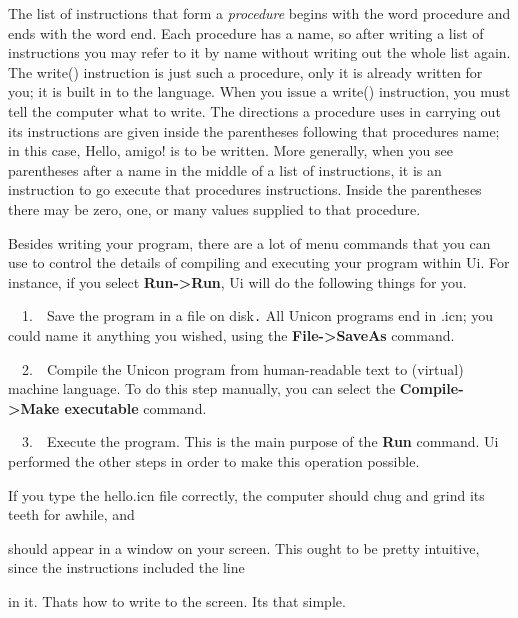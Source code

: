 \bigskip

The list of instructions that form a \textit{procedure }begins with the
word \textsf{procedure} and ends with the word \textsf{end}. Each
procedure has a name, so after writing a list of instructions you may
refer to it by name without writing out the whole list again. The
\textsf{write()} instruction is just such a procedure, only it is
already written for you; it is built in to the language. When you issue
a \textsf{write()} instruction, you must tell the computer what to
write. The directions a procedure uses in carrying out its instructions
are given inside the parentheses following that
procedure{\textquotesingle}s name; in this case,
\textsf{{\textquotedbl}Hello, amigo!{\textquotedbl}} is to be written.
More generally, when you see parentheses after a name in the middle of
a list of instructions, it is an instruction to go execute that
procedure{\textquotesingle}s instructions. Inside the parentheses there
may be zero, one, or many values supplied to that procedure.

Besides writing your program, there are a lot of menu commands that you
can use to control the details of compiling and executing your program
within Ui. For instance, if you select \textbf{Run-{\textgreater}Run},
Ui will do the following things for you.

\ \ 1.\ \ Save the program in a file on disk\texttt{.} All Unicon
programs end in \textsf{.icn}; you could name it anything you wished,
using the \textbf{File-{\textgreater}SaveAs} command.

\ \ 2.\ \ Compile the Unicon program from human-readable text to
(virtual) machine language. To do this step manually, you can select
the\newline
\textbf{Compile-{\textgreater}Make executable} command.

\ \ 3.\ \ Execute the program. This is the main purpose of the
\textbf{Run} command. Ui performed the other steps in order to make
this operation possible.

If you type the \textsf{hello.icn} file correctly, the computer should
chug and grind its teeth for awhile, and


\noindent should appear in a window on your screen. This ought to be pretty
intuitive, since the instructions included the line


\noindent in it. That{\textquotesingle}s how to write to the screen.
It{\textquotesingle}s that simple.

